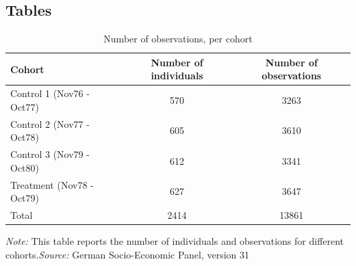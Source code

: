 \documentclass[a4paper ]{article}
\newlength\FHoffset
\begin{document}
    
    
       



\clearpage
\newpage
\subsection{Tables}
\renewcommand\thetable{A\arabic{table}}
\setcounter{table}{0} 


\begin{table}[p]\centering
\caption{Number of observations, per cohort}\label{tab:observations}
\begin{tabular}{lcc}
\toprule
Cohort & Number of individuals & Number of observations \\ 
\midrule
Control 1 (Nov76 - Oct77) & 570 & 3263 \\ 
Control 2 (Nov77 - Oct78) & 605 & 3610 \\
Control 3 (Nov79 - Oct80) & 612 & 3341 \\
Treatment (Nov78 - Oct79) & 627 & 3647 \\
\midrule
Total & 2414 & 13861 \\
\bottomrule
\end{tabular} 
\begin{minipage}{0.9\textwidth} %
{\footnotesize \textit{Note:} This table reports the number of individuals and observations for different cohorts.\newline \textit{Source: }German Socio-Economic Panel, version 31\par}
\end{minipage}
\end{table}


\clearpage

\newpage

	
	
		\setlength\FHoffset{-1.5cm} %
\fancyheadoffset{\FHoffset}
\end{document}
